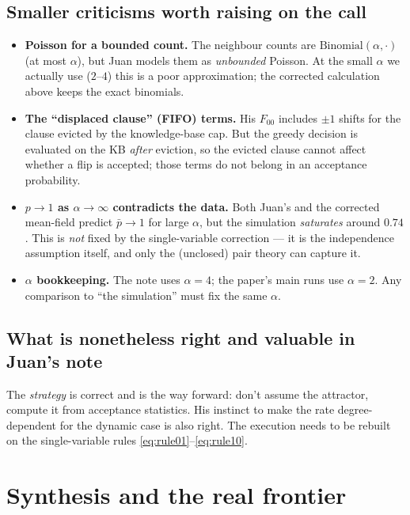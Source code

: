 \documentclass[11pt]{article}
\begin{document}
\subsection{Smaller criticisms worth raising on the call}
\begin{itemize}[nosep]
  \item \textbf{Poisson for a bounded count.} The neighbour counts are
        $\mathrm{Binomial}(\alpha,\cdot)$ (at most $\alpha$), but Juan models them as
        \emph{unbounded} Poisson. At the small $\alpha$ we actually use ($2$--$4$) this is a poor
        approximation; the corrected calculation above keeps the exact binomials.
  \item \textbf{The ``displaced clause'' (FIFO) terms.} His $F_{00}$ includes $\pm1$ shifts for the
        clause evicted by the knowledge-base cap. But the greedy decision is evaluated on the KB
        \emph{after} eviction, so the evicted clause cannot affect whether a flip is accepted; those
        terms do not belong in an acceptance probability.
  \item \textbf{$p\to1$ as $\alpha\to\infty$ contradicts the data.} Both Juan's and the corrected
        mean-field predict $\bar p\to1$ for large $\alpha$, but the simulation \emph{saturates}
        around $0.74$. This is \emph{not} fixed by the single-variable correction --- it is the
        independence assumption itself, and only the (unclosed) pair theory can capture it.
  \item \textbf{$\alpha$ bookkeeping.} The note uses $\alpha=4$; the paper's main runs use
        $\alpha=2$. Any comparison to ``the simulation'' must fix the same $\alpha$.
\end{itemize}

\subsection{What is nonetheless right and valuable in Juan's note}
The \emph{strategy} is correct and is the way forward: don't assume the attractor, compute it from
acceptance statistics. His instinct to make the rate degree-dependent for the dynamic case is also
right. The execution needs to be rebuilt on the single-variable rules \eqref{eq:rule01}--\eqref{eq:rule10}.

\section{Synthesis and the real frontier}
\end{document}
